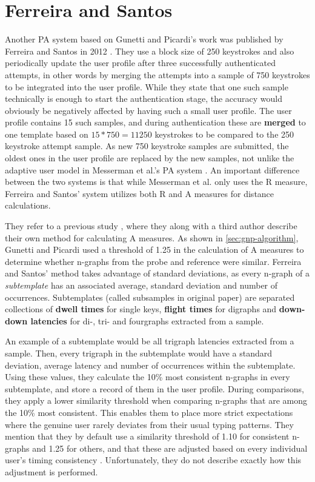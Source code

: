 \documentclass[informationsecurity]{gucmasterproject}
\begin{document}
\chapter{Ferreira and Santos}
\label{chap:ferreira}
Another PA system based on Gunetti and Picardi's work was published by Ferreira and Santos in 2012 \cite{superResults}.
They use a block size of 250 keystrokes and also periodically update the user profile after three successfully authenticated attempts, in other words by merging the attempts into a sample of 750 keystrokes to be integrated into the user profile.
While they state that one such sample technically is enough to start the authentication stage, the accuracy would obviously be negatively affected by having such a small user profile.
The user profile contains 15 such samples, and during authentication these are \textbf{merged} to one template based on $15*750 = 11250$ keystrokes to be compared to the 250 keystroke attempt sample. 
As new 750 keystroke samples are submitted, the oldest ones in the user profile are replaced by the new samples, not unlike the adaptive user model in Messerman et al.'s PA system \cite{Messerman}.
An important difference between the two systems is that while Messerman et al. only uses the R measure, Ferreira and Santos' system utilizes both R and A measures for distance calculations.

They refer to a previous study \cite{superOld}, where they along with a third author describe their own method for calculating A measures.
As shown in \cref{sec:gnp-algorithm}, Gunetti and Picardi used a threshold of 1.25 in the calculation of A measures to determine whether n-graphs from the probe and reference were similar.
Ferreira and Santos' method takes advantage of standard deviations, as every n-graph of a \textit{subtemplate} has an associated average, standard deviation and number of occurrences.
Subtemplates (called subsamples in original paper) are separated collections of \textbf{dwell times} for single keys, \textbf{flight times} for digraphs and \textbf{down-down latencies} for di-, tri- and fourgraphs extracted from a sample.

An example of a subtemplate would be all trigraph latencies extracted from a sample.
Then, every trigraph in the subtemplate would have a standard deviation, average latency and number of occurrences within the subtemplate.
Using these values, they calculate the 10\% most consistent n-graphs in every subtemplate, and store a record of them in the user profile.
During comparisons, they apply a lower similarity threshold when comparing n-graphs that are among the 10\% most consistent.
This enables them to place more strict expectations where the genuine user rarely deviates from their usual typing patterns.
They mention that they by default use a similarity threshold of 1.10 for consistent n-graphs and 1.25 for others, and that these are adjusted based on every individual user's timing consistency \cite{superOld}.
Unfortunately, they do not describe exactly how this adjustment is performed.
\end{document}
